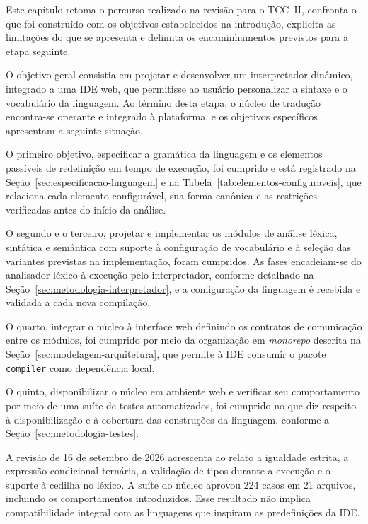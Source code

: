 
Este capítulo retoma o percurso realizado na revisão para o TCC~II, confronta o que foi construído com os objetivos estabelecidos na introdução, explicita as limitações do que se apresenta e delimita os encaminhamentos previstos para a etapa seguinte.

O objetivo geral consistia em projetar e desenvolver um interpretador dinâmico, integrado a uma IDE web, que permitisse ao usuário personalizar a sintaxe e o vocabulário da linguagem. Ao término desta etapa, o núcleo de tradução encontra-se operante e integrado à plataforma, e os objetivos específicos apresentam a seguinte situação.

O primeiro objetivo, especificar a gramática da linguagem e os elementos passíveis de redefinição em tempo de execução, foi cumprido e está registrado na Seção~\ref{sec:especificacao-linguagem} e na Tabela~\ref{tab:elementos-configuraveis}, que relaciona cada elemento configurável, sua forma canônica e as restrições verificadas antes do início da análise.

O segundo e o terceiro, projetar e implementar os módulos de análise léxica, sintática e semântica com suporte à configuração de vocabulário e à seleção das variantes previstas na implementação, foram cumpridos. As fases encadeiam-se do analisador léxico à execução pelo interpretador, conforme detalhado na Seção~\ref{sec:metodologia-interpretador}, e a configuração da linguagem é recebida e validada a cada nova compilação.

O quarto, integrar o núcleo à interface web definindo os contratos de comunicação entre os módulos, foi cumprido por meio da organização em \textit{monorepo} descrita na Seção~\ref{sec:modelagem-arquitetura}, que permite à IDE consumir o pacote \texttt{compiler} como dependência local.

O quinto, disponibilizar o núcleo em ambiente web e verificar seu comportamento por meio de uma suíte de testes automatizados, foi cumprido no que diz respeito à disponibilização e à cobertura das construções da linguagem, conforme a Seção~\ref{sec:metodologia-testes}.

A revisão de 16 de setembro de 2026 acrescenta ao relato a igualdade estrita, a expressão condicional ternária, a validação de tipos durante a execução e o suporte à cedilha no léxico. A suíte do núcleo aprovou 224 casos em 21 arquivos, incluindo os comportamentos introduzidos. Esse resultado não implica compatibilidade integral com as linguagens que inspiram as predefinições da IDE.

